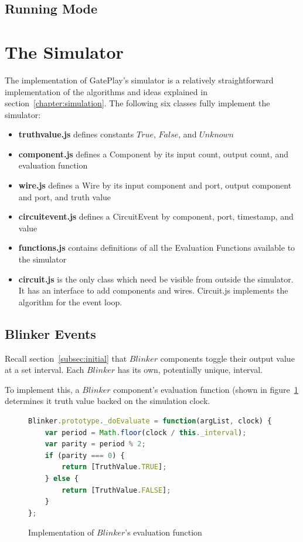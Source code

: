 \subsection{Running Mode}

\section{The Simulator}
\label{section:simulator}
The implementation of GatePlay's simulator is a relatively straightforward implementation of the algorithms and ideas explained in section~\ref{chapter:simulation}. The following six classes fully implement the simulator:

\begin{itemize}
	\item \textbf{truthvalue.js} defines constants $True$, $False$, and $Unknown$
	\item \textbf{component.js} defines a Component by its input count, output count, and evaluation function
	\item \textbf{wire.js} defines a Wire by its input component and port, output component and port, and truth value
	\item \textbf{circuitevent.js} defines a CircuitEvent by component, port, timestamp, and value
	\item \textbf{functions.js} contains definitions of all the Evaluation Functions available to the simulator 
	\item \textbf{circuit.js} is the only class which need be visible from outside the simulator. It has an interface to add components and wires. Circuit.js implements the algorithm for the event loop. 
\end{itemize}

\subsection{Blinker Events}
Recall section~\ref{subsec:initial} that $Blinker$ components toggle their output value at a set interval. Each $Blinker$ has its own, potentially unique, interval.

To implement this, a $Blinker$ component's evaluation function (shown in figure~\ref{fig:blinkereval} determines it truth value backed on the simulation clock.

\begin{figure}
\begin{lstlisting}[language=JavaScript]
Blinker.prototype._doEvaluate = function(argList, clock) {
    var period = Math.floor(clock / this._interval);
    var parity = period % 2;
    if (parity === 0) {
        return [TruthValue.TRUE];
    } else {
        return [TruthValue.FALSE];
    }
};
\end{lstlisting}
\caption{Implementation of $Blinker$'s evaluation function}
\label{fig:blinkereval}
\end{figure}

